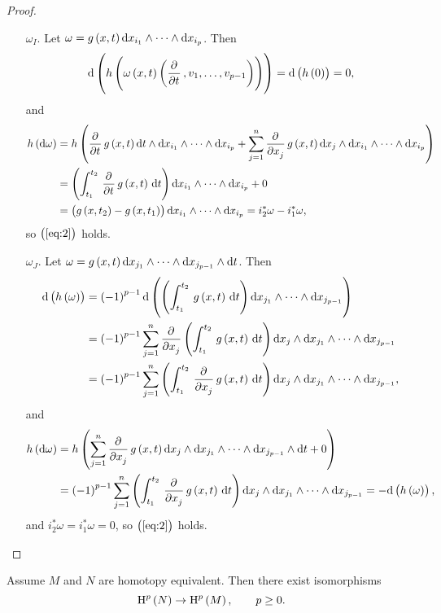 \begin{proof}
\begin{enumerate}[label=Step \arabic*., leftmargin=0.5in]
\pagebreak

\begin{itemize}
\item[$ \omega_I $.] Let $ \omega = g\br{x, t} \d x_{i_1} \wedge \dots \wedge \d x_{i_p} $. Then
$$ \d\br{h\br{\omega\br{x, t}\br{\dpd{}{t}, v_1, \dots, v_{p - 1}}}} = \d\br{h\br{0}} = 0, $$
and
\begin{align*}
h\br{\d\omega}
& = h\br{\dpd{}{t}g\br{x, t} \d t \wedge \d x_{i_1} \wedge \dots \wedge \d x_{i_p} + \sum_{j = 1}^n \dpd{}{x_j}g\br{x, t} \d x_j \wedge \d x_{i_1} \wedge \dots \wedge \d x_{i_p}} \\
& = \br{\intd{t_1}{t_2}{\dpd{}{t}g\br{x, t}}{t}} \d x_{i_1} \wedge \dots \wedge \d x_{i_p} + 0 \\
& = \br{g\br{x, t_2} - g\br{x, t_1}} \d x_{i_1} \wedge \dots \wedge \d x_{i_p}
= i_2^*\omega - i_1^*\omega,
\end{align*}
so $ \br{\ref{eq:2}} $ holds.
\item[$ \omega_J $.] Let $ \omega = g\br{x, t} \d x_{j_1} \wedge \dots \wedge \d x_{j_{p - 1}} \wedge \d t $. Then
\begin{align*}
\d\br{h\br{\omega}}
& = \br{-1}^{p - 1}\d\br{\br{\intd{t_1}{t_2}{g\br{x, t}}{t}} \d x_{j_1} \wedge \dots \wedge \d x_{j_{p - 1}}} \\
& = \br{-1}^{p - 1}\sum_{j = 1}^n \dpd{}{x_j}\br{\intd{t_1}{t_2}{g\br{x, t}}{t}} \d x_j \wedge \d x_{j_1} \wedge \dots \wedge \d x_{j_{p - 1}} \\
& = \br{-1}^{p - 1}\sum_{j = 1}^n \br{\intd{t_1}{t_2}{\dpd{}{x_j}g\br{x, t}}{t}} \d x_j \wedge \d x_{j_1} \wedge \dots \wedge \d x_{j_{p - 1}},
\end{align*}
and
\begin{align*}
h\br{\d\omega}
& = h\br{\sum_{j = 1}^n \dpd{}{x_j}g\br{x, t} \d x_j \wedge \d x_{j_1} \wedge \dots \wedge \d x_{j_{p - 1}} \wedge \d t + 0} \\
& = \br{-1}^{p - 1}\sum_{j = 1}^n \br{\intd{t_1}{t_2}{\dpd{}{x_j}g\br{x, t}}{t}} \d x_j \wedge \d x_{j_1} \wedge \dots \wedge \d x_{j_{p - 1}}
= -\d\br{h\br{\omega}},
\end{align*}
and $ i_2^*\omega = i_1^*\omega = 0 $, so $ \br{\ref{eq:2}} $ holds.
\end{itemize}
\end{enumerate}
\end{proof}

\begin{corollary}
\label{cor:2.14}
Assume $ M $ and $ N $ are homotopy equivalent. Then there exist isomorphisms
$$ \H^p\br{N} \to \H^p\br{M}, \qquad p \ge 0. $$
\end{corollary}

